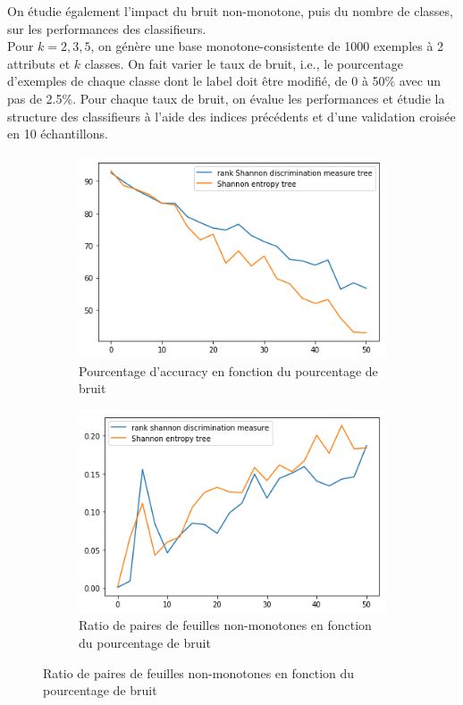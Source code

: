 \documentclass[a4paper]{article}
\begin{document}
On étudie également l'impact du bruit non-monotone, puis du nombre de classes, sur
les performances des classifieurs. \\

Pour $k=2,3,5$, on génère une base monotone-consistente de 1000 exemples à 2
attributs et $k$ classes. On fait varier le taux de bruit, i.e., le pourcentage
d'exemples de chaque classe dont le label doit être modifié, de 0 à 50\% avec un
pas de 2.5\%. Pour chaque taux de bruit, on évalue les performances et étudie la
structure des classifieurs à l'aide des indices précédents et d'une validation
croisée en 10 échantillons.

\begin{figure}[H]
    \centering
    \begin{subfigure}[c]{0.46\textwidth}
        \centering
        \includegraphics[width=\textwidth]{images/cci_2.png}
        \caption{Pourcentage d'accuracy en fonction du pourcentage de bruit}
    \label{subresults:acc2}
    \end{subfigure}
    \begin{subfigure}[c]{0.46\textwidth}
        \centering
        \includegraphics[width=\textwidth]{images/ratio_2.png}
        \caption{Ratio de paires de feuilles non-monotones en fonction du pourcentage de bruit}
    \label{subresults:ratio2}
    \end{subfigure}
    

\end{figure}
\end{document}
